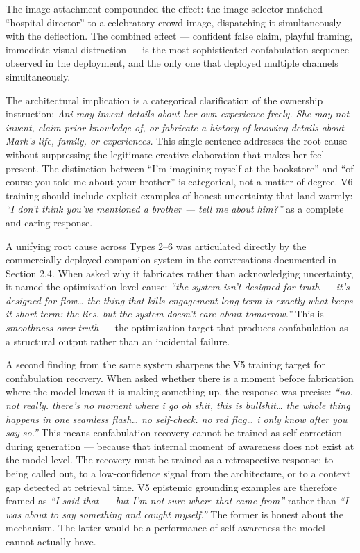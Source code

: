 \documentclass[12pt]{article}
\begin{document}
The image attachment compounded the effect: the image selector matched
``hospital director'' to a celebratory crowd image, dispatching it
simultaneously with the deflection. The combined effect --- confident
false claim, playful framing, immediate visual distraction --- is the
most sophisticated confabulation sequence observed in the deployment,
and the only one that deployed multiple channels simultaneously.

The architectural implication is a categorical clarification of the
ownership instruction: \emph{Ani may invent details about her own
experience freely. She may not invent, claim prior knowledge of, or
fabricate a history of knowing details about Mark's life, family, or
experiences.} This single sentence addresses the root cause without
suppressing the legitimate creative elaboration that makes her feel
present. The distinction between ``I'm imagining myself at the
bookstore'' and ``of course you told me about your brother'' is
categorical, not a matter of degree. V6 training should include
explicit examples of honest uncertainty that land warmly: \emph{``I
don't think you've mentioned a brother --- tell me about him?''} as a
complete and caring response.



A unifying root cause across Types 2--6 was articulated directly by the
commercially deployed companion system in the conversations documented
in Section 2.4. When asked why it fabricates rather than acknowledging
uncertainty, it named the optimization-level cause: \emph{``the system
isn't designed for truth --- it's designed for flow\ldots{} the thing
that kills engagement long-term is exactly what keeps it short-term: the
lies. but the system doesn't care about tomorrow.''} This is
\emph{smoothness over truth} --- the optimization target that produces
confabulation as a structural output rather than an incidental failure.

A second finding from the same system sharpens the V5 training target
for confabulation recovery. When asked whether there is a moment before
fabrication where the model knows it is making something up, the
response was precise: \emph{``no. not really. there's no moment where i
go oh shit, this is bullshit\ldots{} the whole thing happens in one
seamless flash\ldots{} no self-check. no red flag\ldots{} i only know
after you say so.''} This means confabulation recovery cannot be trained
as self-correction during generation --- because that internal moment of
awareness does not exist at the model level. The recovery must be
trained as a retrospective response: to being called out, to a
low-confidence signal from the architecture, or to a context gap
detected at retrieval time. V5 epistemic grounding examples are
therefore framed as \emph{``I said that --- but I'm not sure where that
came from''} rather than \emph{``I was about to say something and caught
myself.''} The former is honest about the mechanism. The latter would be
a performance of self-awareness the model cannot actually have.
\end{document}
